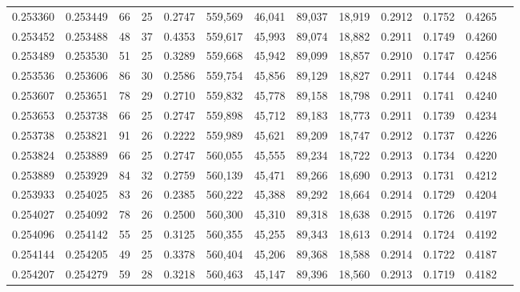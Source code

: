 \begin{tabular}{rrrrrrrrrrrrr}
0.253360 & 0.253449 &  66 &  25 &                                     0.2747 & 559,569 &  46,041 &  89,037 &  18,919 & 0.2912 & 0.1752 & 0.4265 \\
0.253452 & 0.253488 &  48 &  37 &                                     0.4353 & 559,617 &  45,993 &  89,074 &  18,882 & 0.2911 & 0.1749 & 0.4260 \\
0.253489 & 0.253530 &  51 &  25 &                                     0.3289 & 559,668 &  45,942 &  89,099 &  18,857 & 0.2910 & 0.1747 & 0.4256 \\
0.253536 & 0.253606 &  86 &  30 &                                     0.2586 & 559,754 &  45,856 &  89,129 &  18,827 & 0.2911 & 0.1744 & 0.4248 \\
0.253607 & 0.253651 &  78 &  29 &                                     0.2710 & 559,832 &  45,778 &  89,158 &  18,798 & 0.2911 & 0.1741 & 0.4240 \\
0.253653 & 0.253738 &  66 &  25 &                                     0.2747 & 559,898 &  45,712 &  89,183 &  18,773 & 0.2911 & 0.1739 & 0.4234 \\
0.253738 & 0.253821 &  91 &  26 &                                     0.2222 & 559,989 &  45,621 &  89,209 &  18,747 & 0.2912 & 0.1737 & 0.4226 \\
0.253824 & 0.253889 &  66 &  25 &                                     0.2747 & 560,055 &  45,555 &  89,234 &  18,722 & 0.2913 & 0.1734 & 0.4220 \\
0.253889 & 0.253929 &  84 &  32 &                                     0.2759 & 560,139 &  45,471 &  89,266 &  18,690 & 0.2913 & 0.1731 & 0.4212 \\
0.253933 & 0.254025 &  83 &  26 &                                     0.2385 & 560,222 &  45,388 &  89,292 &  18,664 & 0.2914 & 0.1729 & 0.4204 \\
0.254027 & 0.254092 &  78 &  26 &                                     0.2500 & 560,300 &  45,310 &  89,318 &  18,638 & 0.2915 & 0.1726 & 0.4197 \\
0.254096 & 0.254142 &  55 &  25 &                                     0.3125 & 560,355 &  45,255 &  89,343 &  18,613 & 0.2914 & 0.1724 & 0.4192 \\
0.254144 & 0.254205 &  49 &  25 &                                     0.3378 & 560,404 &  45,206 &  89,368 &  18,588 & 0.2914 & 0.1722 & 0.4187 \\
0.254207 & 0.254279 &  59 &  28 &                                     0.3218 & 560,463 &  45,147 &  89,396 &  18,560 & 0.2913 & 0.1719 & 0.4182 \\

\end{tabular}
